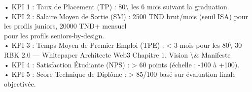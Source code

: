 • KPI 1 : Taux de Placement (TP) : 80\textbackslash{}%
les 6 mois suivant la graduation.\\
\vspace{0.5em}
• KPI 2 : Salaire Moyen de Sortie (SM) : 2500 TND brut/mois (seuil ISA) pour les profils juniors, 20000 TND+ mensuel\\
pour les profils seniors-by-design.\\
\vspace{0.5em}
• KPI 3 : Temps Moyen de Premier Emploi (TPE) : \textless{} 3 mois pour les 80\textbackslash{}%
\vspace{0.5em}
\vspace{0.5em}
\vspace{0.5em}
\vspace{0.5em}
30\\
RBK 2.0 — Whitepaper Architecte Web3                                                                         Chapitre 1. Vision \textbackslash{}& Manifeste\\
\vspace{0.5em}
\vspace{0.5em}
\vspace{0.5em}
• KPI 4 : Satisfaction Étudiante (NPS) : \textgreater{} 60 points (échelle : -100 à +100).\\
\vspace{0.5em}
• KPI 5 : Score Technique de Diplôme : \textgreater{} 85/100 basé sur évaluation finale objectivée.\\
\vspace{0.5em}
\vspace{0.5em}
